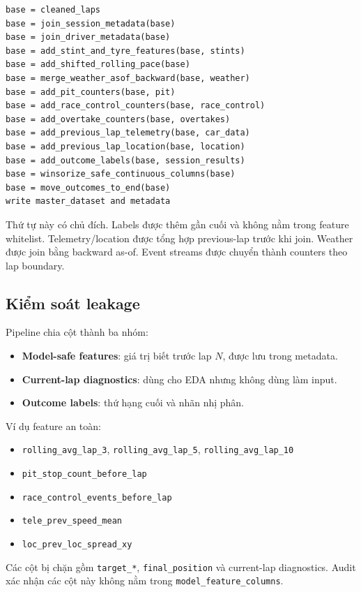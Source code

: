 \documentclass[conference]{IEEEtran}
\begin{document}
\begin{lstlisting}
base = cleaned_laps
base = join_session_metadata(base)
base = join_driver_metadata(base)
base = add_stint_and_tyre_features(base, stints)
base = add_shifted_rolling_pace(base)
base = merge_weather_asof_backward(base, weather)
base = add_pit_counters(base, pit)
base = add_race_control_counters(base, race_control)
base = add_overtake_counters(base, overtakes)
base = add_previous_lap_telemetry(base, car_data)
base = add_previous_lap_location(base, location)
base = add_outcome_labels(base, session_results)
base = winsorize_safe_continuous_columns(base)
base = move_outcomes_to_end(base)
write master_dataset and metadata
\end{lstlisting}

Thứ tự này có chủ đích. Labels được thêm gần cuối và không nằm trong feature whitelist. Telemetry/location được tổng hợp previous-lap trước khi join. Weather được join bằng backward as-of. Event streams được chuyển thành counters theo lap boundary.

\subsection{Kiểm soát leakage}
Pipeline chia cột thành ba nhóm:

\begin{itemize}
    \item \textbf{Model-safe features}: giá trị biết trước lap \(N\), được lưu trong metadata.
    \item \textbf{Current-lap diagnostics}: dùng cho EDA nhưng không dùng làm input.
    \item \textbf{Outcome labels}: thứ hạng cuối và nhãn nhị phân.
\end{itemize}

Ví dụ feature an toàn:

\begin{itemize}
    \item \texttt{rolling\_avg\_lap\_3}, \texttt{rolling\_avg\_lap\_5}, \texttt{rolling\_avg\_lap\_10}
    \item \texttt{pit\_stop\_count\_before\_lap}
    \item \texttt{race\_control\_events\_before\_lap}
    \item \texttt{tele\_prev\_speed\_mean}
    \item \texttt{loc\_prev\_loc\_spread\_xy}
\end{itemize}

Các cột bị chặn gồm \texttt{target\_*}, \texttt{final\_position} và current-lap diagnostics. Audit xác nhận các cột này không nằm trong \texttt{model\_feature\_columns}.
\end{document}
